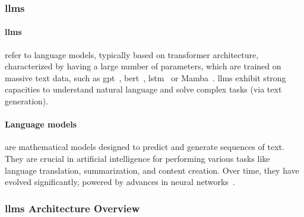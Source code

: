 \subsubsection{\glspl{llm}}

\paragraph{\glspl{llm}} refer to language models, typically based on transformer
architecture, characterized by having a large number of parameters, which are
trained on massive text data, such as \gls{gpt}~\cite{radford2018improving},
\gls{bert}~\cite{devlin2018bert}, \gls{lstm}~\cite{hochreiter1997lstm} or
Mamba~\cite{gu2023mamba}. \glspl{llm} exhibit strong capacities to understand
natural language and solve complex tasks (via text generation).

\paragraph{Language models} are mathematical models designed to predict and generate
sequences of text. They are crucial in artificial intelligence for performing
various tasks like language translation, summarization, and content creation.
Over time, they have evolved significantly, powered by advances in neural
networks~\cite{naveed2023}.

\subsubsection{\glspl{llm} Architecture Overview}

